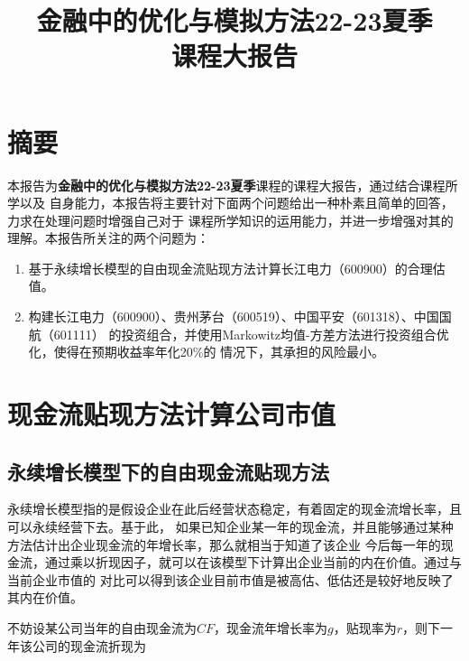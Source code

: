 \documentclass[UTF8]{ctexart}
\numberwithin{figure}{section}
\numberwithin{table}{section}
\numberwithin{equation}{section}
\begin{document}
    \title{
        \vskip 2cm \huge 金融中的优化与模拟方法22-23夏季 \\  
                    \huge 课程大报告 \\ 
                }

        \date{}
    \maketitle
    \clearpage

    \tableofcontents
    \clearpage

\section{摘要}
        本报告为\textbf{金融中的优化与模拟方法22-23夏季}课程的课程大报告，通过结合课程所学以及
    自身能力，本报告将主要针对下面两个问题给出一种朴素且简单的回答，力求在处理问题时增强自己对于
    课程所学知识的运用能力，并进一步增强对其的理解。本报告所关注的两个问题为：

        \begin{enumerate}
            \item 基于永续增长模型的自由现金流贴现方法计算长江电力（600900）的合理估值。
            \item 构建长江电力（600900）、贵州茅台（600519）、中国平安（601318）、中国国航（601111）
            的投资组合，并使用Markowitz均值-方差方法进行投资组合优化，使得在预期收益率年化20\%的
            情况下，其承担的风险最小。
        \end{enumerate}



\section{现金流贴现方法计算公司市值}
    \subsection{永续增长模型下的自由现金流贴现方法}
        永续增长模型指的是假设企业在此后经营状态稳定，有着固定的现金流增长率，且可以永续经营下去。基于此，
    如果已知企业某一年的现金流，并且能够通过某种方法估计出企业现金流的年增长率，那么就相当于知道了该企业
    今后每一年的现金流，通过乘以折现因子，就可以在该模型下计算出企业当前的内在价值。通过与当前企业市值的
    对比可以得到该企业目前市值是被高估、低估还是较好地反映了其内在价值。

        不妨设某公司当年的自由现金流为$CF$，现金流年增长率为$g$，贴现率为$r$，则下一年该公司的现金流折现为
\end{document}
